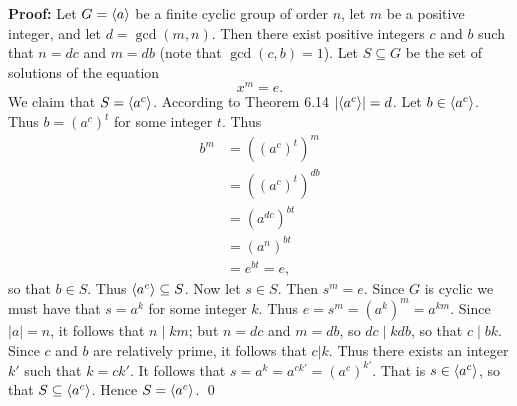 \begin{enumerate}
      \textbf{Proof:} Let $G = \langle a \rangle$ be a finite cyclic group of order $n$, 
      let $m$ be a positive integer, and let $d = \gcd(m, n)$. Then there exist
      positive integers $c$ and $b$ such that $n = dc$ and $m = db$ (note that
      $\gcd(c, b) = 1$). Let $S \subseteq G$ be the set of solutions of the
      equation $$x^m = e.$$
      We claim that $S = \langle a^c \rangle$. According to Theorem 6.14
      $|\langle a^c \rangle| = d$. Let $b \in \langle a^c \rangle$. Thus $b = (a^{c})^t$ for some 
      integer $t$. Thus
      \begin{align*}
         b^m &= ((a^{c})^t)^m \\
             &= ((a^{c})^t)^{db} \\
             &= (a^{dc})^{bt} \\
             &= (a^n)^{bt} \\
             &= e^{bt} = e,
      \end{align*}
      so that $b \in S$. Thus $\langle a^c \rangle \subseteq S$. Now let $s \in S$. Then 
      $s^m = e$. Since $G$ is cyclic we must have that $s = a^k$ for some
      integer $k$. Thus $e = s^m = (a^k)^m = a^{km}$. Since $|a| = n$, it
      follows that $n \mid km$; but $n = dc$ and $m = db$, so $dc \mid kdb$, so
      that $c \mid bk$. Since $c$ and $b$ are relatively prime, it follows that
      $c | k$. Thus there exists an integer $k'$ such that $k = ck'$. It
      follows that $s = a^k = a^{ck'} = (a^c)^{k'}$. That is $s \in \langle a^c \rangle$, 
      so that $S \subseteq \langle a^c \rangle$. Hence $S = \langle a^c \rangle$. \qed
\end{enumerate}
